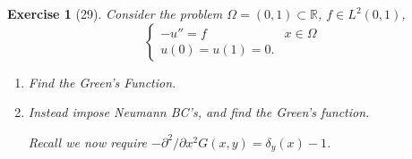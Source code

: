 \documentclass[letterpaper,twoside,11pt]{article}
\theoremstyle{mystyle}
\newtheorem*{exercise}{Exercise}
\newcommand{\R}{{\mathbb R}}
\newcommand{\cbk}{\color{black}}
\begin{document}
\cbk 











\newpage 
\begin{exercise}[29]
  Consider the problem 
  $\Omega= \left( 0,1 \right)\subset \R$, $f\in L^2 \left( 0,1 \right)$, 
  \[\left\{ {\begin{array}{*{20}{l}}
    -u'' = f & x \in \Omega \\[.2cm]
    u(0) = u(1) = 0.
  \end{array}} \right.\]
  \begin{enumerate}
    \item Find the Green's Function. 
    \item Instead impose Neumann BC's, and find the Green's function. 
    
    Recall we now require \(-\partial^2/\partial x^2 G(x, y) = \delta_y(x) -1\).
  \end{enumerate}
\end{exercise}
\end{document}
